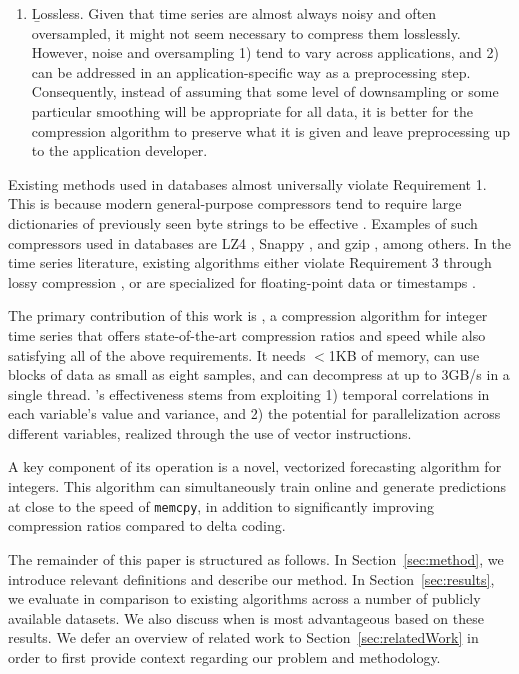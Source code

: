 \begin{enumerate}
\item \b{Lossless}. Given that time series are almost always noisy and often oversampled, it might not seem necessary to compress them losslessly. However, noise and oversampling 1) tend to vary across applications, and 2) can be addressed in an application-specific way as a preprocessing step. Consequently, instead of assuming that some level of downsampling or some particular smoothing will be appropriate for all data, it is better for the compression algorithm to preserve what it is given and leave preprocessing up to the application developer.
\end{enumerate}

Existing methods used in databases almost universally violate Requirement 1. This is because modern general-purpose compressors tend to require large dictionaries of previously seen byte strings to be effective \cite{lz4, snappy, gzip, zlib}. Examples of such compressors used in databases are LZ4 \cite{lz4, chronicleDB, rocksDB, druid}, Snappy \cite{snappy, openTSDB, influxDB, kairosDB, parquet}, and gzip \cite{respawnDB, parquet}, among others. In the time series literature, existing algorithms either violate Requirement 3 through lossy compression \cite{sax, tsCompressSmartGrid, ecgCompressLossy, apca, lemireSegmentation}, or are specialized for floating-point data \cite{gorilla} or timestamps \cite{gorilla, berkeleyTreeDB, fastpfor}.

The primary contribution of this work is \mine,
a compression algorithm for integer time series that offers state-of-the-art compression ratios and speed while also satisfying all of the above requirements. It needs $<$1KB of memory, can use blocks of data as small as eight samples, and can decompress at up to 3GB/s in a single thread. \mine's effectiveness stems from exploiting 1) temporal correlations in each variable's value and variance, and 2) the potential for parallelization across different variables, realized through the use of vector instructions.

A key component of its operation is a novel, vectorized forecasting algorithm for integers. This algorithm can simultaneously train online and generate predictions at close to the speed of \texttt{memcpy}, in addition to significantly improving compression ratios compared to delta coding.

The remainder of this paper is structured as follows. In Section~\ref{sec:method}, we introduce relevant definitions and describe our method. In Section~\ref{sec:results}, we evaluate \minesp in comparison to existing algorithms across a number of publicly available datasets. We also discuss when \minesp is most advantageous based on these results. We defer an overview of related work to Section~\ref{sec:relatedWork} in order to first provide context regarding our problem and methodology.

